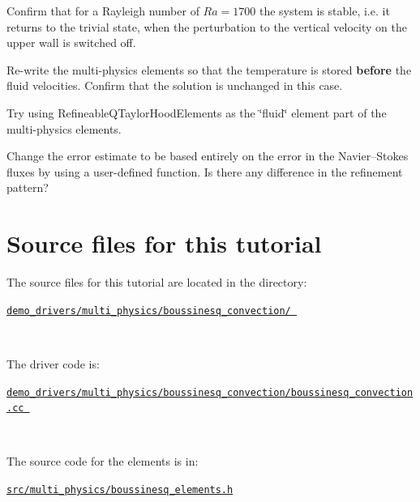 \begin{DoxyEnumerate}
\item Confirm that for a Rayleigh number of $ Ra = 1700 $ the system is stable, i.\+e. it returns to the trivial state, when the perturbation to the vertical velocity on the upper wall is switched off.~\newline
~\newline

\item Re-\/write the multi-\/physics elements so that the temperature is stored {\bfseries before} the fluid velocities. Confirm that the solution is unchanged in this case.~\newline
~\newline

\item Try using {\ttfamily Refineable\+Q\+Taylor\+Hood\+Elements} as the \char`\"{}fluid\char`\"{} element part of the multi-\/physics elements.
\item Change the error estimate to be based entirely on the error in the Navier--Stokes fluxes by using a user-\/defined function. Is there any difference in the refinement pattern?
\end{DoxyEnumerate}

 

\hypertarget{index_sources}{}\section{Source files for this tutorial}\label{index_sources}

\begin{DoxyItemize}
\item The source files for this tutorial are located in the directory\+:~\newline
~\newline
\begin{center} \href{../../../../demo_drivers/multi_physics/boussinesq_convection/}{\tt demo\+\_\+drivers/multi\+\_\+physics/boussinesq\+\_\+convection/ } \end{center} ~\newline

\item The driver code is\+: ~\newline
~\newline
\begin{center} \href{../../../../demo_drivers/multi_physics/boussinesq_convection/boussinesq_convection.cc}{\tt demo\+\_\+drivers/multi\+\_\+physics/boussinesq\+\_\+convection/boussinesq\+\_\+convection.\+cc } \end{center}  ~\newline

\item The source code for the elements is in\+: ~\newline
~\newline
\begin{center} \href{../../../../src/multi_physics/boussinesq_elements.h}{\tt src/multi\+\_\+physics/boussinesq\+\_\+elements.\+h} \end{center} 
\end{DoxyItemize}



